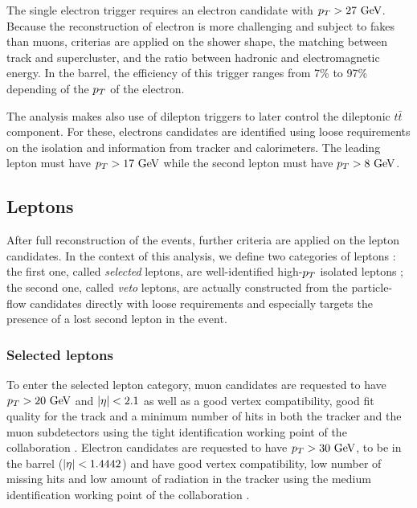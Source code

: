     The single electron trigger requires an electron candidate with $p_T > 27~\text{GeV}$. Because
    the reconstruction of electron is more challenging and subject to fakes than muons, 
    criterias are applied on the shower shape, the matching between track and supercluster, 
    and the ratio between hadronic and electromagnetic energy. In the barrel, the efficiency 
    of this trigger ranges from 7\% to 97\% depending of the $p_T$ of the electron.

    The analysis makes also use of dilepton triggers to later control the dileptonic
    $t\bar{t}$ component. For these, electrons candidates are identified using loose 
    requirements on the isolation and information from tracker and calorimeters. The 
    leading lepton must have $p_T > 17~\text{GeV}$ while the second lepton must have $p_T > 8~\text{GeV}$.

        \subsection{Leptons}

    After full reconstruction of the events, further criteria are applied on the lepton
    candidates. In the context of this analysis, we define two categories of leptons :
    the first one, called \emph{selected} leptons, are well-identified high-$p_T$ 
    isolated leptons ; the second one, called \emph{veto} leptons, are actually 
    constructed from the particle-flow candidates directly with loose requirements and 
    especially targets the presence of a lost second lepton in the event.

            \subsubsection{Selected leptons}

        To enter the selected lepton category, muon candidates are requested to have 
    $p_T > 20~\text{GeV}$ and $\left| \eta \right| < 2.1$ as well as a good vertex compatibility, good fit 
    quality for the track and a minimum number of hits in both the tracker and the muon 
    subdetectors using the tight identification working point of the collaboration 
    .
        Electron candidates are requested to have $p_T > 30~\text{GeV}$, to be in the barrel 
    ($\left| \eta \right| < 1.4442$) and have good vertex compatibility, low number of missing hits 
    and low amount of radiation in the tracker using the medium identification working 
    point of the collaboration 
    .

